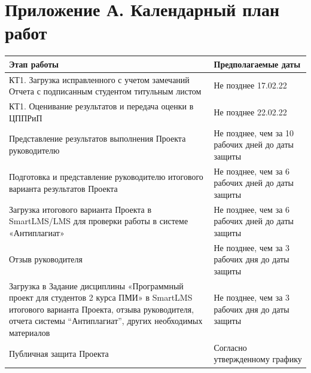 \documentclass{article}
\begin{document}



\section*{Приложение А. Календарный план работ}

\setlength{\tabcolsep}{18pt}
\renewcommand{\arraystretch}{1.5}
\begin{tabular}{|m{10cm}|m{5cm}|}
    \hline
    \textbf{Этап работы} & \textbf{Предполагаемые даты}\\
    \hline
    КТ1. Загрузка исправленного с учетом замечаний Отчета с подписанным студентом титульным листом & Не позднее 17.02.22\\
    \hline
    КТ1. Оценивание результатов и передача оценки в ЦППРиП & Не позднее 22.02.22\\
    \hline
    Представление результатов выполнения Проекта руководителю & Не позднее, чем за 10 рабочих дней до даты защиты\\
    \hline
    Подготовка и представление руководителю итогового варианта результатов Проекта & Не позднее, чем за 6 рабочих дней до даты защиты\\
    \hline
    Загрузка итогового варианта Проекта в SmartLMS/LMS для проверки работы в системе «Антиплагиат» & Не позднее, чем за 6 рабочих дней до даты защиты\\
    \hline
    Отзыв руководителя & Не позднее, чем за 3 рабочих дня до даты защиты\\
    \hline
    Загрузка в Задание дисциплины «Программный проект для студентов 2 курса ПМИ» в SmartLMS итогового варианта Проекта, отзыва руководителя, отчета системы “Антиплагиат”, других необходимых материалов & Не позднее, чем за 3 рабочих дня до даты защиты\\
    \hline
    Публичная защита Проекта & Согласно утвержденному графику\\
    \hline  
\end{tabular}
\end{document}
